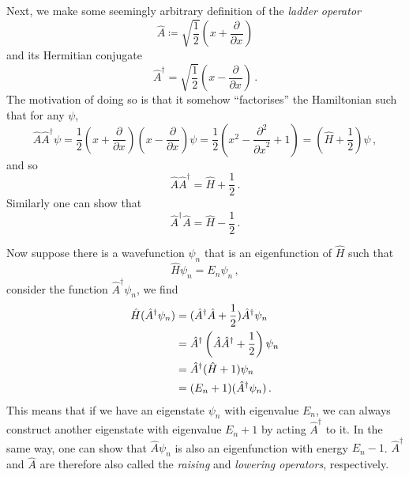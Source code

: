 \documentclass{article}
\theoremstyle{plain}\theoremheaderfont{\normalfont\itshape}\theorembodyfont{\rmfamily}\theoremseparator{.}\newtheorem*{rem}{Remark}\newtheorem*{ex}{Example}\newtheorem*{proof}{Proof}\newtheorem*{altp}{Alternative proof}
\theoremstyle{plain}\theoremheaderfont{\normalfont\bfseries}\theorembodyfont{\rmfamily}\theoremseparator{.}\newtheorem{thm}{Theorem}[section]\newtheorem{lem}[thm]{Lemma}\newtheorem{prop}[thm]{Proposition}\newtheorem*{cor}{Corollary}\newtheorem{defn}[thm]{Definition}\newtheorem{clm}[thm]{Claim}\newtheorem{clminproof}{Claim}\newtheorem*{law}{Law}\newtheorem{pos}[thm]{Postulate}
\theoremstyle{break}\theoremheaderfont{\normalfont\itshape}\theorembodyfont{\rmfamily}\theoremseparator{.\medskip}\newtheorem*{proofskip}{Proof}\newtheorem*{exs}{Examples}\newtheorem*{rems}{Remarks}
\theoremstyle{break}\theoremheaderfont{\normalfont\bfseries}\theorembodyfont{\rmfamily}\theoremseparator{.\medskip}\newtheorem{lemskip}[thm]{Lemma}\newtheorem{defnskip}[thm]{Definition}\newtheorem{propskip}[thm]{Proposition}\newtheorem{thmskip}[thm]{Theorem}
\numberwithin{equation}{section}
\newcommand{\pdv}[3][]{\frac{\partial^{#1} #2}{{\partial #3}^{#1}}}
\begin{document}
    Next, we make some seemingly arbitrary definition of the \textit{ladder operator}
    \begin{equation}
        \hat{A}\coloneqq\sqrt{\frac{1}{2}}\left(x+\pdv{}{x}\right)
    \end{equation}
    and its Hermitian conjugate
    \begin{equation}
        \hat{A}^\dagger=\sqrt{\frac{1}{2}}\left(x-\pdv{}{x}\right)\,.
    \end{equation}
    The motivation of doing so is that it somehow ``factorises'' the Hamiltonian such that for any \(\psi\),
    \begin{equation}
        \hat{A}\hat{A}^\dagger\psi=\frac{1}{2}\left(x+\pdv{}{x}\right)\left(x-\pdv{}{x}\right)\psi=\frac{1}{2}\left(x^2-\pdv[2]{}{x}+1\right)=\left(\hat{H}+\frac{1}{2}\right)\psi\,,
    \end{equation}
    and so
    \begin{equation}
        \hat{A}\hat{A}^\dagger=\hat{H}+\frac{1}{2}\,.
    \end{equation}
    Similarly one can show that
    \begin{equation}
        \hat{A}^\dagger\hat{A}=\hat{H}-\frac{1}{2}\,.
    \end{equation}

    Now suppose there is a wavefunction \(\psi_n\) that is an eigenfunction of \(\hat{H}\) such that
    \begin{equation}
        \hat{H}\psi_n=E_n\psi_n\,,
    \end{equation}
    consider the function \(\hat{A}^\dagger\psi_n\), we find
    \begin{align}
        \hat{H}(\hat{A}^\dagger\psi_n) &=(\hat{A}^\dagger\hat{A}+\frac{1}{2})\hat{A}^\dagger\psi_n\notag\\
        &=\hat{A}^\dagger\left(\hat{A}\hat{A}^\dagger+\frac{1}{2}\right)\psi_n\notag\\
        &=\hat{A}^\dagger(\hat{H}+1)\psi_n\notag\\
        &=(E_n+1)(\hat{A}^\dagger\psi_n)\,.
    \end{align}
    This means that if we have an eigenstate \(\psi_n\) with eigenvalue \(E_n\), we can always construct another eigenstate with eigenvalue \(E_n+1\) by acting \(\hat{A}^\dagger\) to it. In the same way, one can show that \(\hat{A}\psi_n\) is also an eigenfunction with energy \(E_n-1\). \(\hat{A}^\dagger\) and \(\hat{A}\) are therefore also called the \textit{raising} and \textit{lowering operators}, respectively.
\end{document}
